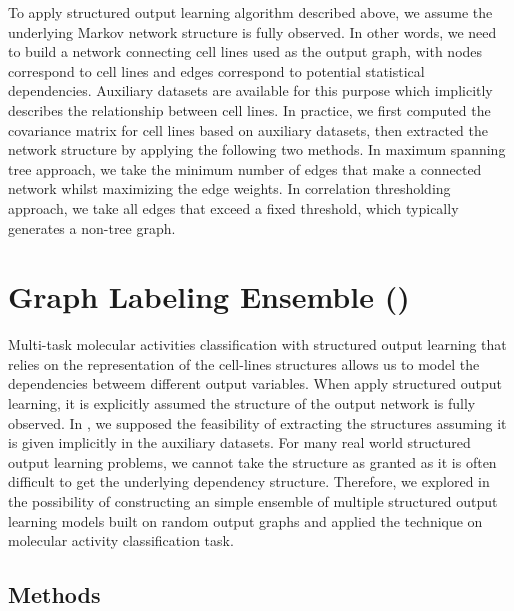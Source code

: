{%
To apply structured output learning algorithm described above, we assume the underlying Markov network structure is fully observed.
In other words, we need to build a network connecting cell lines used as the output graph, with nodes correspond to cell lines and edges correspond to potential statistical dependencies.
Auxiliary datasets are available for this purpose \citep{Shoemaker06the}  which implicitly describes the relationship between cell lines.
In practice, we first computed the covariance matrix for cell lines based on auxiliary datasets, then extracted the network structure by applying the following two methods.
In maximum spanning tree approach, we take the minimum number of edges that make a connected network whilst maximizing the edge weights.
In correlation thresholding approach, we take all edges that exceed a fixed threshold, which typically generates a non-tree graph.


%
%
\section{Graph Labeling Ensemble (\mve)}\label{sc_su11}

Multi-task molecular activities classification with structured output learning that relies on the representation of the cell-lines structures allows us to model the dependencies betweem different output variables.
When apply structured output learning, it is explicitly assumed the structure of the output network is fully observed.
In , we supposed the feasibility of extracting the structures assuming it is given implicitly in the auxiliary datasets.
For many real world structured output learning problems, we cannot take the structure as granted as it is often difficult to get the underlying dependency structure.
Therefore, we explored in  the possibility of constructing an simple ensemble of multiple structured output learning models built on random output graphs and applied the technique on molecular activity classification task.


\subsection{Methods}

}
